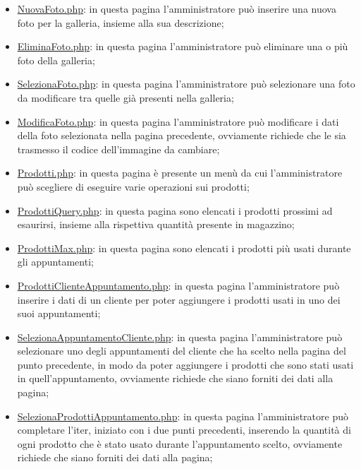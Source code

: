 {\begin{itemize}
		\item \href{http://tecweb2016.studenti.math.unipd.it/smarches/NuovaFoto.php}{NuovaFoto.php}: in questa pagina l'amministratore può inserire una nuova foto per la galleria, insieme alla sua descrizione;
		\item \href{http://tecweb2016.studenti.math.unipd.it/smarches/EliminaFoto.php}{EliminaFoto.php}: in questa pagina l'amministratore può eliminare una o più foto della galleria;
		\item \href{http://tecweb2016.studenti.math.unipd.it/smarches/SelezionaFoto.php}{SelezionaFoto.php}: in questa pagina l'amministratore può selezionare una foto da modificare tra quelle già presenti nella galleria;
		\item \underline{ModificaFoto.php}: in questa pagina l'amministratore può modificare i dati della foto selezionata nella pagina precedente, ovviamente richiede che le sia trasmesso il codice dell'immagine da cambiare;
		\item \href{http://tecweb2016.studenti.math.unipd.it/smarches/Prodotti.php}{Prodotti.php}: in questa pagina è presente un menù da cui l'amministratore può scegliere di eseguire varie operazioni sui prodotti;
		\item \href{http://tecweb2016.studenti.math.unipd.it/smarches/ProdottiQuery.php}{ProdottiQuery.php}: in questa pagina sono elencati i prodotti prossimi ad esaurirsi, insieme alla rispettiva quantità presente in magazzino;
		\item \href{http://tecweb2016.studenti.math.unipd.it/smarches/ProdottiMax.php}{ProdottiMax.php}: in questa pagina sono elencati i prodotti più usati durante gli appuntamenti;
		\item \href{http://tecweb2016.studenti.math.unipd.it/smarches/ProdottiClienteAppuntamento.php}{ProdottiClienteAppuntamento.php}: in questa pagina l'amministratore può inserire i dati di un cliente per poter aggiungere i prodotti usati in uno dei suoi appuntamenti;
		\item \underline{SelezionaAppuntamentoCliente.php}: in questa pagina l'amministratore può selezionare uno degli appuntamenti del cliente che ha scelto nella pagina del punto precedente, in modo da poter aggiungere i prodotti che sono stati usati in quell'appuntamento, ovviamente richiede che siano forniti dei dati alla pagina;
		\item \underline{SelezionaProdottiAppuntamento.php}: in questa pagina l'amministratore può completare l'iter, iniziato con i due punti precedenti, inserendo la quantità di ogni prodotto che è stato usato durante l'appuntamento scelto, ovviamente richiede che siano forniti dei dati alla pagina;

\end{itemize}}
